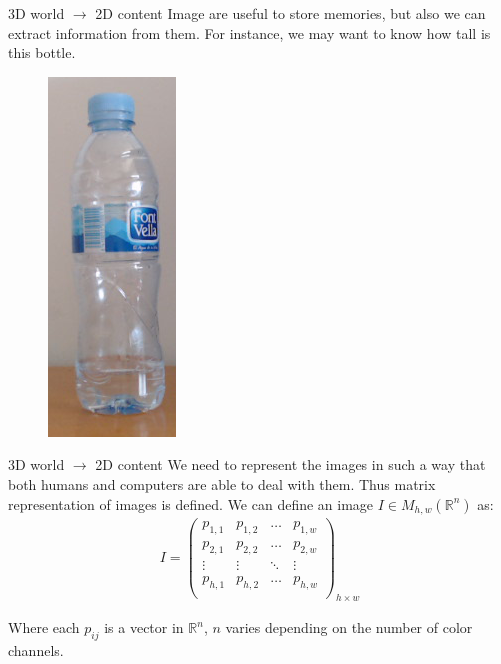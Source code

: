\begin{frame}{\secname}{3D world $\rightarrow$ 2D content}
    Image are useful to store memories, but also we can extract information from them. For instance, we may want to know how tall is this bottle.
    \begin{figure}
        \centering
        \includegraphics[height=0.5\textheight]{img/agua.png}
    \end{figure}
\end{frame}

\begin{frame}{\secname}{3D world $\rightarrow$ 2D content}
    We need to represent the images in such a way that both humans and computers are able to deal with them. Thus matrix representation of images is defined. We can define an image $I \in M_{h,w}\left(\mathbb{R}^n\right)$ as:
    \begin{gather*}
        I = \begin{pmatrix}
            p_{1,1} & p_{1,2} & \dots & p_{1,w} \\
            p_{2,1} & p_{2,2} & \dots & p_{2,w} \\
            \vdots & \vdots & \ddots & \vdots \\
            p_{h,1} & p_{h,2} & \dots & p_{h,w} \\
        \end{pmatrix}_{h \times w}
    \end{gather*}
    
    Where each $p_{ij}$ is a vector in $\mathbb{R}^n$, $n$ varies depending on the number of color channels.
\end{frame}

